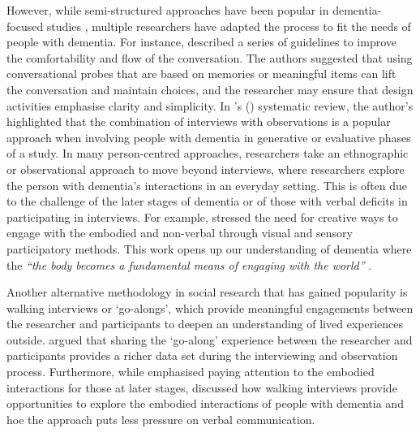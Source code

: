 However, while semi-structured approaches have been popular in dementia-focused studies \citep{samsi_everyday_2013,mazaheri2013experiences,cheston2000involving,lejman2013ethics}, multiple researchers have adapted the process to fit the needs of people with dementia. For instance, \cite{mayer2013lessons} described a series of guidelines to improve the comfortability and flow of the conversation. The authors suggested that using conversational probes that are based on memories or meaningful items can lift the conversation and maintain choices, and the researcher may ensure that design activities emphasise clarity and simplicity. In \citeauthor{suijkerbuijk_active_2019}'s (\citeyear{suijkerbuijk_active_2019}) systematic review, the author's highlighted that the combination of interviews with observations is a popular approach when involving people with dementia in generative or evaluative phases of a study. In many person-centred approaches, researchers take an ethnographic or observational approach to move beyond interviews, where researchers explore the person with dementia's interactions in an everyday setting. This is often due to the challenge of the later stages of dementia or of those with verbal deficits in participating in interviews. For example, \cite{kontos_embodiment_2013} stressed the need for creative ways to engage with the embodied and non-verbal through visual and sensory participatory methods. This work opens up our understanding of dementia where the \textit{``the body becomes a fundamental means of engaging with the world''} \citep[p.296]{kontos_embodiment_2013}.

Another alternative methodology in social research that has gained popularity is walking interviews or `go-alongs', which provide meaningful engagements between the researcher and participants to deepen an understanding of lived experiences outside. \cite{hein2008mobile} argued that sharing the `go-along' experience between the researcher and participants provides a richer data set during the interviewing and observation process. Furthermore, while \cite{foley_struggle_2019} emphasised paying attention to the embodied interactions for those at later stages, \cite{kullberg2017walking}  discussed how walking interviews provide opportunities to explore the embodied interactions of people with dementia and hoe the approach puts less pressure on verbal communication. 

